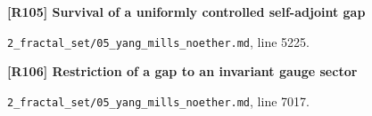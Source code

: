\documentclass[11pt,a4paper]{article}
\begin{document}
\par\medskip\noindent\begin{minipage}{\linewidth}\textbf{[R105] Survival of a uniformly controlled self-adjoint gap}\label{src:thm-mass-gap-rg-fixed-point}\par
{\small\texttt{}\par
\nolinkurl{2_fractal_set/05_yang_mills_noether.md}, line 5225.\par}
\end{minipage}\par

\par\medskip\noindent\begin{minipage}{\linewidth}\textbf{[R106] Restriction of a gap to an invariant gauge sector}\label{src:thm-gauge-sector-mass-gap}\par
{\small\texttt{}\par
\nolinkurl{2_fractal_set/05_yang_mills_noether.md}, line 7017.\par}
\end{minipage}\par
\end{document}
